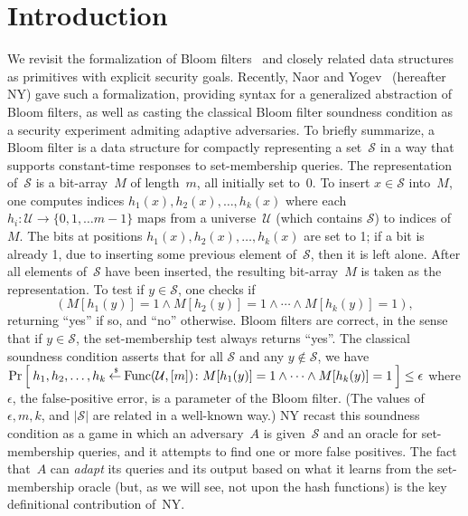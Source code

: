 
\section{Introduction}
We revisit the formalization of Bloom filters~\cite{xxx} and closely
related data structures as primitives with explicit security goals.
Recently, Naor and Yogev~\cite{xxx} (hereafter NY) gave such a
formalization, providing syntax for a generalized abstraction of
Bloom filters, as well as casting the classical Bloom filter
soundness condition as a security experiment admiting adaptive
adversaries.  To briefly summarize, a Bloom filter is a data
structure for compactly representing a set~$\mathcal{S}$ in a way
that supports constant-time responses to set-membership queries. The
representation of~$\mathcal{S}$ is a bit-array~$M$ of length~$m$,
all initially set to~0.  To insert $x \in \mathcal{S}$ into~$M$, one
computes indices $h_1(x),h_2(x),\ldots,h_k(x)$ where each $h_i
\colon \mathcal{U} \to \{0,1,\ldots m-1\}$ maps from a
universe~$\mathcal{U}$ (which contains $\mathcal{S}$) to indices
of~$M$.  The bits at positions $h_1(x),h_2(x),\ldots,h_k(x)$ are set
to 1; if a bit is already 1, due to inserting some previous element
of~$\mathcal{S}$, then it is left alone.  After all elements
of~$\mathcal{S}$ have been inserted, the resulting bit-array~$M$ is
taken as the representation.  To test if $y \in \mathcal{S}$, one
checks if \[(M[h_1(y)]=1 \wedge M[h_2(y)]=1 \wedge \cdots \wedge
M[h_k(y)]=1),\] returning ``yes'' if so, and ``no'' otherwise. Bloom
filters are correct, in the sense that if $y \in \mathcal{S}$, the
set-membership test always returns ``yes''.  The classical soundness
condition asserts that for all $\mathcal{S}$ and any $y
\notin\mathcal{S}$, we have $\Pr\left[\: h_1,h_2,\ldots,h_k {\:\stackrel{{\scriptscriptstyle \hspace{0.2em}\$}} {\leftarrow}\:}
\mathrm{Func}(\mathcal{U},[m])\colon M[h_1(y)]=1 \wedge \cdots
\wedge M[h_k(y)]=1 \:\right] \leq \epsilon$ where $\epsilon$, the
false-positive error, is a parameter of the Bloom filter.  (The
values of~$\epsilon,m,k$, and $|\mathcal{S}|$ are related in a
well-known way.) NY recast this soundness condition as a game in
which an adversary~$A$ is given~$\mathcal{S}$ and an oracle for
set-membership queries, and it attempts to find one or more false
positives. The fact that~$A$ can \emph{adapt} its queries and its
output based on what it learns from the set-membership oracle (but,
as we will see, not upon the hash functions) is the key definitional
contribution of~NY.

